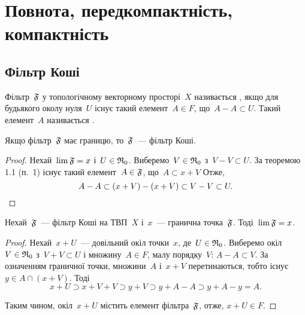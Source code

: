 \chapter{Повнота, передкомпактність, компактність}

\section{Фільтр Коші}

\begin{definition}
    Фільтр~$\frak F$ у топологічному векторному просторі~$X$ називається , якщо для будьякого околу нуля~$U$ існує такий елемент~$A \in F$, що~$A - A \subset U$. Такий елемент~$A$ називається .
\end{definition}

\begin{theorem}
    Якщо фільтр~$\frak F$ має границю, то~$\frak F$~--- фільтр Коші.
\end{theorem}

\begin{proof}
    Нехай~$\lim \frak F = x$ і~$U \in \frak R_0$. Виберемо~$V \in \frak R_0$ з~$V - V \subset U$. За \error теоремою 1.1 (п.~1) існує такий елемент~$A \in \frak F$, що~$A \subset x + V$ Отже,
    \begin{equation*}
        A - A \subset(x + V) -(x + V) \subset V - V \subset U. \qedhere
    \end{equation*}
\end{proof}

\begin{theorem}
    Нехай~$\frak F$~--- фільтр Коші на ТВП~$X$ і~$x$~--- гранична точка~$\frak F$. Тоді~$\lim \frak F = x$.
\end{theorem}

\begin{proof}
    Нехай~$x + U$~--- довільний окіл точки~$x$, де~$U \in \frak R_0$. Виберемо окіл~$V \in \frak R_0$ з~$V + V \subset U$ і множину~$A \in F$, малу порядку~$V$: $A - A \subset V$. За означенням граничної точки, множини~$A$ і~$x + V$ перетинаються, тобто існує~$y \in A \cap(x + V)$. Тоді
    \begin{equation*}
        x + U \supset x + V + V \supset y + V \supset y + A - A \supset y + A - y = A.
    \end{equation*}

    Таким чином, окіл~$x + U$ містить елемент фільтра~$\frak F$, отже, $x + U \in F$.
\end{proof}

